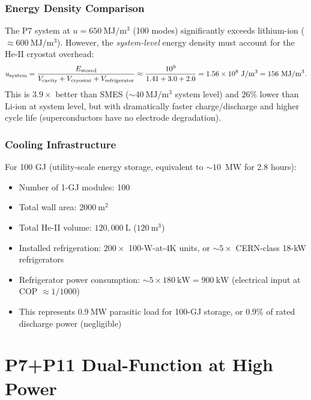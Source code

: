 \documentclass[aps,prd,twocolumn,superscriptaddress]{revtex4-2}
\begin{document}
\subsubsection{Energy Density Comparison}

The P7 system at $u = 650~\mathrm{MJ/m^3}$ (100 modes) significantly
exceeds lithium-ion ($\approx 600~\mathrm{MJ/m^3}$).
However, the \emph{system-level} energy density must account for the
He-II cryostat overhead:
\begin{equation}
u_{\rm system} = \frac{E_{\rm stored}}{V_{\rm cavity}
+ V_{\rm cryostat} + V_{\rm refrigerator}}
\approx \frac{10^9}{1.41 + 3.0 + 2.0} = 1.56\times 10^8~\mathrm{J/m^3}
= 156~\mathrm{MJ/m^3}.
\end{equation}
This is $3.9\times$ better than SMES ($\sim 40~\mathrm{MJ/m^3}$ system
level) and $26\%$ lower than Li-ion at system level, but with dramatically
faster charge/discharge and higher cycle life (superconductors have no
electrode degradation).

\subsubsection{Cooling Infrastructure}

For 100 GJ (utility-scale energy storage, equivalent to $\sim 10$~MW
for 2.8 hours):
\begin{itemize}
\item Number of 1-GJ modules: 100
\item Total wall area: $2000~\mathrm{m^2}$
\item Total He-II volume: $120{,}000~\mathrm{L}$ ($120~\mathrm{m^3}$)
\item Installed refrigeration: $200\times$ 100-W-at-4K units,
  or $\sim 5\times$ CERN-class 18-kW refrigerators
\item Refrigerator power consumption: $\sim 5\times 180~\mathrm{kW}
  = 900~\mathrm{kW}$ (electrical input at COP $\approx 1/1000$)
\item This represents $0.9~\mathrm{MW}$ parasitic load for 100-GJ storage,
  or $0.9\%$ of rated discharge power (negligible)
\end{itemize}

\section{P7+P11 Dual-Function at High Power}
\label{sec:p7p11}
\end{document}
